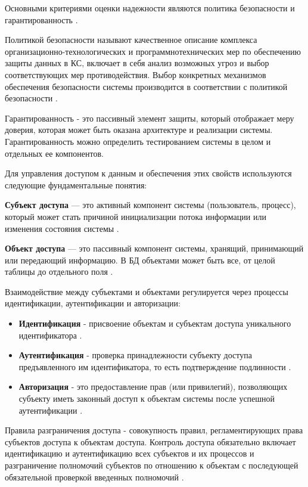Основными критериями оценки надежности являются политика безопасности и гарантированность \autocite[сс. 15-18]{Skakun}.

Политикой безопасности называют качественное описание комплекса организационно-технологических и программнотехнических мер по обеспечению защиты данных в КС, включает в себя анализ возможных угроз и выбор соответствующих мер противодействия. Выбор конкретных механизмов обеспечения безопасности системы производится в соответствии с политикой безопасности \autocite[сс. 15-18]{Skakun}.

Гарантированность - это пассивный элемент защиты, который отображает меру доверия, которая может быть оказана архитектуре и реализации системы. Гарантированность можно определить тестированием системы в целом и отдельных ее компонентов.

Для управления доступом к данным и обеспечения этих свойств используются следующие фундаментальные понятия:

\textbf{Субъект доступа} — это активный компонент системы (пользователь, процесс), который может стать причиной инициализации потока информации или изменения состояния системы \autocite[сс. 15-18]{Skakun}. 

\textbf{Объект доступа} — это пассивный компонент системы, хранящий, принимающий или передающий информацию. В БД объектами может быть все, от целой таблицы до отдельного поля \autocite[сс. 15-18]{Skakun}.

Взаимодействие между субъектами и объектами регулируется через процессы идентификации, аутентификации и авторизации:
\begin{itemize}
    \item \textbf{Идентификация} - присвоение объектам и субъектам доступа уникального идентификатора \autocite[сс. 15-18]{Skakun}.
    \item \textbf{Аутентификация}  - проверка принадлежности субъекту доступа предъявленного им идентификатора, то есть подтверждение подлинности \autocite[сс. 15-18]{Skakun}.
    \item \textbf{Авторизация} - это предоставление прав (или привилегий), позволяющих субъекту иметь законный доступ к объектам системы после успешной аутентификации \autocite[сс. 15-18]{Skakun}.
\end{itemize}

Правила разграничения доступа - совокупность правил, регламентирующих права субъектов доступа к объектам доступа. Контроль доступа обязательно включает идентификацию и аутентификацию всех субъектов и их процессов и разграничение полномочий субъектов по отношению к объектам с последующей обязательной проверкой введенных полномочий \autocite[сс. 15-18]{Skakun}.

